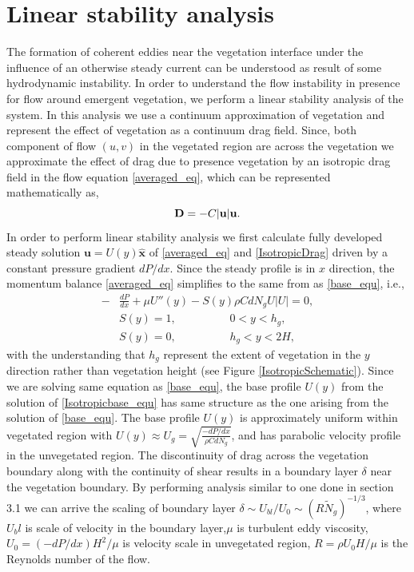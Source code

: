 \documentclass[12pt]{report}   %
\newcommand{\bx}{{\boldsymbol{\hat{x}}}}
\newcommand{\bu}{\mathbf{u}}
\newcommand{\hg}{h_g}
\newcommand{\Ndg}{\tilde{N}_g}
\begin{document}
\section{Linear stability analysis}
The formation of coherent eddies near the vegetation interface under the influence of an otherwise steady current can be understood as result of some hydrodynamic instability. In order to understand the flow instability in presence for flow around emergent vegetation, we perform a linear stability analysis of the system. In this analysis we use a continuum approximation of vegetation and represent the effect of vegetation as a continuum drag field. 
Since, both component of flow $(u,v)$ in the vegetated region are across the vegetation we approximate the effect of drag due to presence vegetation by an isotropic drag field in the flow equation \eqref{averaged_eq}, which can be represented mathematically as,
\begin{equation}
 {\bf{D}} = -C|\bu|\bu.
 \label{IsotropicDrag}
\end{equation}
In order to perform linear stability analysis we first calculate fully developed steady solution $\bu = U(y) \bx$ of \eqref{averaged_eq} and \eqref{IsotropicDrag} driven by a constant pressure gradient $dP/dx$. Since the steady profile is in $x$ direction, the momentum balance \eqref{averaged_eq}
simplifies to the same from as \eqref{base_equ}, i.e.,
\begin{equation}
\begin{split}
 -&\frac{dP}{dx}+\mu U''(y) -S(y) \rho C d N_gU |U| =0,\\
 &S(y) = 1, \hspace{2cm} 0<y<\hg,\\
 &S(y) = 0, \hspace{2cm} \hg< y< 2H,
\label{Isotropicbase_equ}
\end{split}
\end{equation}
with the understanding that $h_g$ represent the extent of vegetation in the $y$ direction rather than vegetation height (see Figure \ref{IsotropicSchematic}). Since we are solving same equation as \eqref{base_equ}, the base profile $U(y)$ from the solution of \eqref{Isotropicbase_equ} has same structure as the one arising from the solution of \eqref{base_equ}. The base profile $U(y)$ is approximately uniform within vegetated region with 
$U(y) \approx U_g = \sqrt{\frac{-dP/dx}{\rho C d N_g}}$, and has parabolic velocity profile in the unvegetated region. The discontinuity of drag across the vegetation boundary along with the continuity of shear results in a boundary layer $\delta$ near the vegetation boundary. By performing analysis similar to one done in section 3.1 we can arrive the scaling of boundary layer $\delta \sim U_{bl}/U_0 \sim (R\Ndg)^{-1/3}$, where $U_bl$ is scale of velocity in the boundary layer,$\mu$ is turbulent eddy viscosity, $U_0 = (-dP/dx)H^2/\mu$ is velocity scale in unvegetated region, $R = \rho U_0 H/\mu$ is the Reynolds number of the flow.
\end{document}
